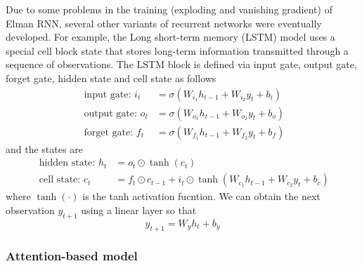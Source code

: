 \documentclass[12pt,a4paper]{article}
\begin{document}
Due to some problems in the training (exploding and vanishing gradient) of Elman RNN, several other variants of recurrent networks were eventually developed. For example, the Long short-term memory (LSTM) model uses a special cell block state that stores long-term information transmitted through a sequence of observations. The LSTM block is defined via input gate, output gate, forget gate, hidden state and cell state as follows
$$
\begin{aligned}
\text { input gate: } {i}_{t} &=\sigma\left({W}_{i_{1}} {h}_{t-1}+{W}_{i_{2}} y_{t}+{b}_{i}\right) \\
\text { output gate: } {o}_{t} &=\sigma\left({W}_{o_{1}} {h}_{t-1}+{W}_{o_{2}} y_{t}+{b}_{o}\right) \\
\text { forget gate: } {f}_{t} &=\sigma\left({W}_{f_{1}} {h}_{t-1}+{W}_{f_{2}} y_{t}+{b}_{f}\right)
\end{aligned}
$$
and the states are
$$
\begin{aligned}
\text { hidden state: } h_{t} &=o_{t} \odot \tanh \left(c_{t}\right) \\
\text { cell state: } c_{t} &=f_{t} \odot c_{t-1}+i_{t} \odot \tanh \left(W_{c_{1}} h_{t-1}+W_{c_{2}} y_{t}+b_{c}\right)
\end{aligned}
$$
where $\tanh(\cdot)$ is the tanh activation fucntion. We can obtain the next observation $y_{t+1}$ using a linear layer so that
$$y_{t+1} = W_y h_{t} + b_y$$

\subsubsection{Attention-based model}
\end{document}
